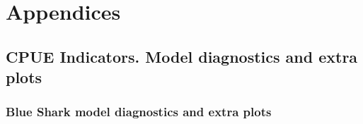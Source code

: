 
\section{Appendices}
% 
\subsection{CPUE Indicators.  Model diagnostics and extra plots}

% 

 \subsubsection*{Blue Shark model diagnostics and extra plots}

%   
%   
%   
%   
 
 
%  
%  
%  
 

